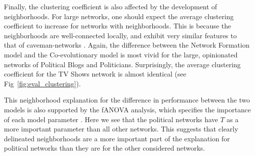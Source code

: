 \documentclass{article}
\begin{document}
Finally, the clustering coefficient is also affected by the development of neighborhoods. For large networks, one should expect the average clustering coefficient to increase for networks with neighborhoods. This is because the neighborhoods are well-connected locally, and exhibit very similar features to that of caveman-networks \cite{watts_networks_1999}. Again, the difference between the Network Formation model and the Co-evolutionary model is most vivid for the large, opinionated networks of Political Blogs and Politicians. Surprisingly, the average clustering coefficient for the TV Shows network is almost identical (see Fig~\ref{fig:eval_clustering}).

This neighborhood explanation for the difference in performance between the two models is also supported by the fANOVA analysis, which specifies the importance of each model parameter \cite{hutter2014efficient}. 
Here we see that the political networks have $T$ as a more important parameter than all other networks. This suggests that clearly delineated neighborhoods are a more important part of the explanation for political networks than they are for the other considered networks. 
\end{document}
